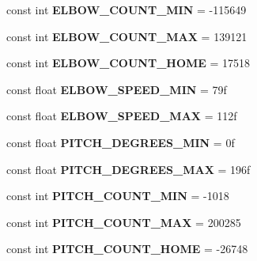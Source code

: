 \begin{DoxyCompactItemize}
const int {\bfseries E\+L\+B\+O\+W\+\_\+\+C\+O\+U\+N\+T\+\_\+\+M\+IN} = -\/115649
\item 
\mbox{\label{class_scorbot_e_r_i_x_a68f8c9ec65f9a9e0c471f0525d49b74c}} 
const int {\bfseries E\+L\+B\+O\+W\+\_\+\+C\+O\+U\+N\+T\+\_\+\+M\+AX} = 139121
\item 
\mbox{\label{class_scorbot_e_r_i_x_a5a764a3f7db0a23f0e8b2e571fddfef5}} 
const int {\bfseries E\+L\+B\+O\+W\+\_\+\+C\+O\+U\+N\+T\+\_\+\+H\+O\+ME} = 17518
\item 
\mbox{\label{class_scorbot_e_r_i_x_a288e9b0a384a2bc95ebc19a2602e7757}} 
const float {\bfseries E\+L\+B\+O\+W\+\_\+\+S\+P\+E\+E\+D\+\_\+\+M\+IN} = 79f
\item 
\mbox{\label{class_scorbot_e_r_i_x_ab4ecdd199a869328cf465ce33538de35}} 
const float {\bfseries E\+L\+B\+O\+W\+\_\+\+S\+P\+E\+E\+D\+\_\+\+M\+AX} = 112f
\item 
\mbox{\label{class_scorbot_e_r_i_x_ab8b9f93fd377ef4e5e17f07b9083f1f4}} 
const float {\bfseries P\+I\+T\+C\+H\+\_\+\+D\+E\+G\+R\+E\+E\+S\+\_\+\+M\+IN} = 0f
\item 
\mbox{\label{class_scorbot_e_r_i_x_a4ab04d513fdffa1f3c249727e820bccb}} 
const float {\bfseries P\+I\+T\+C\+H\+\_\+\+D\+E\+G\+R\+E\+E\+S\+\_\+\+M\+AX} = 196f
\item 
\mbox{\label{class_scorbot_e_r_i_x_a90f3c619f31e7ee212c1b94dc80fdde2}} 
const int {\bfseries P\+I\+T\+C\+H\+\_\+\+C\+O\+U\+N\+T\+\_\+\+M\+IN} = -\/1018
\item 
\mbox{\label{class_scorbot_e_r_i_x_a108c08642b2dccbd48e7c5585c65726c}} 
const int {\bfseries P\+I\+T\+C\+H\+\_\+\+C\+O\+U\+N\+T\+\_\+\+M\+AX} = 200285
\item 
\mbox{\label{class_scorbot_e_r_i_x_adee0034426113ad105bbda04aa5da409}} 
const int {\bfseries P\+I\+T\+C\+H\+\_\+\+C\+O\+U\+N\+T\+\_\+\+H\+O\+ME} = -\/26748
\item 
\mbox{\label{class_scorbot_e_r_i_x_a270f6ad77571bd64655e0bb6329792fe}} 

\end{DoxyCompactItemize}
